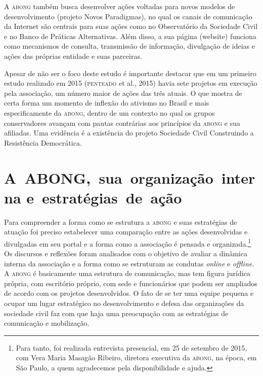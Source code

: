 A \textsc{abong} também busca desenvolver ações voltadas para novos modelos de
desenvolvimento (projeto Novos Paradigmas), no qual os canais de
comunicação da Internet são centrais para suas ações como no
Observatório da Sociedade Civil e no Banco de Práticas Alternativas.
Além disso, a sua página (website) funciona como mecanismos de consulta,
transmissão de informação, divulgação de ideias e ações das próprias
entidade e suas parceiras.

Apesar de não ser o foco deste estudo é importante destacar que em um
primeiro estudo realizado em 2015 (\textsc{penteado} et al., 2015) havia sete
projetos em execução pela associação, um número maior de ações das três
atuais. O que mostra de certa forma um momento de inflexão do ativismo
no Brasil e mais especificamente da \textsc{abong}, dentro de um contexto no qual
os grupos conservadores avançam com pautas contrárias aos princípios da
\textsc{abong} e sua afiliadas. Uma evidência é a existência do projeto Sociedade
Civil Construindo a Resistência Democrática.

\section{A~ABONG,~sua~organização~interna e~estratégias~de~ação}

Para compreender a forma como se estrutura a \textsc{abong} e suas estratégias de
atuação foi preciso estabelecer uma comparação entre as ações
desenvolvidas e divulgadas em seu portal e a forma como a associação é
pensada e organizada.\footnote{Para tanto, foi realizada entrevista
  presencial, em 25 de setembro de 2015, com Vera Maria Masagão Ribeiro,
  diretora executiva da \textsc{abong}, na época, em São Paulo, a quem
  agradecemos pela disponibilidade e ajuda.} Os discursos e reflexões
foram analisados com o objetivo de avaliar a dinâmica interna da
associação e a forma como se estruturam as condutas \emph{online} e \emph{offline}.
A \textsc{abong} é basicamente uma estrutura de comunicação, mas tem figura
jurídica própria, com escritório próprio, com sede e funcionários que
podem ser ampliados de acordo com os projetos desenvolvidos. O fato de
se ter uma equipe pequena e ocupar um lugar estratégico no
desenvolvimento e defesa das organizações da sociedade civil faz com que
haja uma preocupação com as estratégias de comunicação e mobilização.

